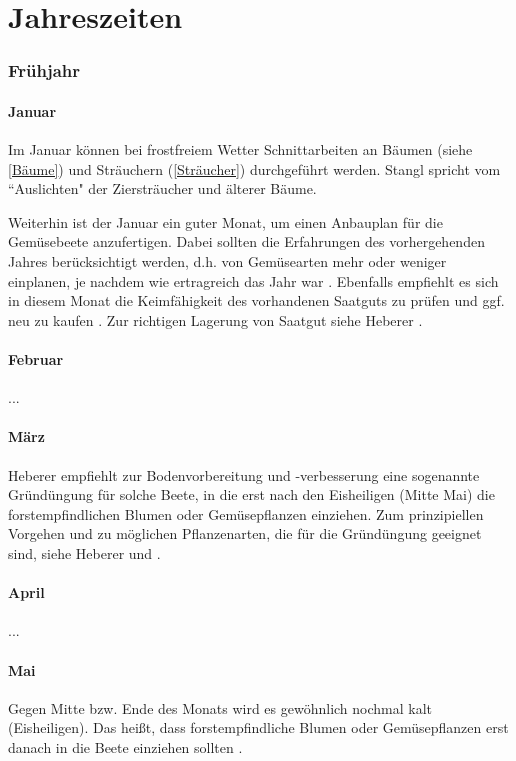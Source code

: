 \part{Jahreszeiten}

\pagebreak

\section{Frühjahr}

\subsection{Januar}

Im Januar können bei frostfreiem Wetter Schnittarbeiten an \textrightarrow Bäumen (siehe \ref{Bäume}) und \textrightarrow Sträuchern (\ref{Sträucher}) durchgeführt werden.
Stangl \cite[S.~256]{Stangl1995} spricht vom ``Auslichten" der Ziersträucher und älterer Bäume.

Weiterhin ist der Januar ein guter Monat, um einen Anbauplan für die Gemüsebeete anzufertigen.
Dabei sollten die Erfahrungen des vorhergehenden Jahres berücksichtigt werden, d.h. von Gemüsearten mehr oder weniger einplanen, je nachdem wie ertragreich das Jahr war \cite[S.~256]{Stangl1995}.
Ebenfalls empfiehlt es sich in diesem Monat die Keimfähigkeit des vorhandenen Saatguts zu prüfen und ggf. neu zu kaufen \cite[S.~216]{Heberer2018}.
Zur richtigen Lagerung von Saatgut siehe Heberer \cite[S.~179]{Heberer2018}.

\subsection{Februar}

...

\subsection{März}
Heberer \cite[S.~11]{Heberer2018} empfiehlt zur Bodenvorbereitung und -verbesserung eine sogenannte Gründüngung für solche Beete, in die erst nach den Eisheiligen (Mitte Mai) die forstempfindlichen Blumen oder Gemüsepflanzen einziehen.
Zum prinzipiellen Vorgehen und zu möglichen Pflanzenarten, die für die Gründüngung geeignet sind, siehe Heberer \cite[S.~11]{Heberer2018} und \cite[S.~114f]{Heberer2018}.

\subsection{April}

...

\subsection{Mai}

Gegen Mitte bzw. Ende des Monats wird es gewöhnlich nochmal kalt (Eisheiligen).
Das heißt, dass forstempfindliche Blumen oder Gemüsepflanzen erst danach in die Beete einziehen sollten \cite[S.~11]{Heberer2018}.



\pagebreak
